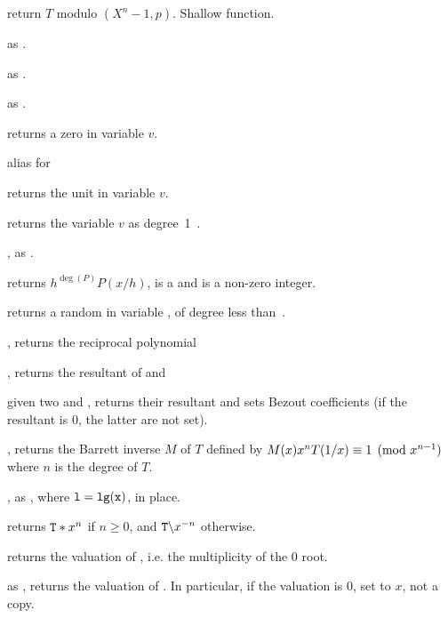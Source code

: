  return $T$ modulo
$(X^n - 1, p)$. Shallow function.

 as .

 as
.

 as .


 returns a zero  in variable $v$.

 alias for 

 returns the unit  in variable $v$.

 returns the variable $v$ as degree~1~.

, as .

 returns $h^{\deg(P)} P(x/h)$,
 is a  and  is a non-zero integer.

 returns a random 
in variable , of degree less than~.

, returns the reciprocal polynomial

, returns the resultant
of  and 

given two   and ,
returns their resultant and sets Bezout coefficients (if the resultant is 0,
the latter are not set).

, returns the Barrett inverse
$M$ of $T$ defined by $M(x)\*x^n\*T(1/x)\equiv 1\pmod{x^{n-1}}$ where $n$ is
the degree of $T$.

, as , where
${\tt l} = {\tt lg(x)}$, in place.

 returns ${\tt T} * x^n$ if $n\geq 0$,
and $\kbd{T} \bs x^{-n}$ otherwise.

 returns the valuation of , i.e. the
multiplicity of the $0$ root.

 as , returns the
valuation of . In particular, if the valuation is $0$, set 
to $x$, not a copy.

